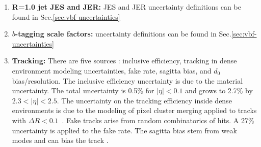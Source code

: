 \begin{enumerate}
\item \textbf{R=1.0 jet JES and JER:} JES and JER uncertainty definitions can be found in Sec.\ref{sec:vbf-uncertainties}
    

  \item \textbf{$b$-tagging scale factors:} \btagging uncertainty definitions can be found in Sec.\ref{sec:vbf-uncertainties}
  
  
  \item \textbf{Tracking:} There are five sources : inclusive efficiency, tracking in dense environment modeling uncertainties, fake rate, sagitta bias, and $d_0$ bias/resolution. The inclusive efficiency uncertainty is due to the material uncertainty.  The total uncertainty is 0.5\% for $|\eta| < 0.1$ and grows to 2.7\% by $2.3 < |\eta| < 2.5$.  The uncertainty on the tracking efficiency inside dense environments is due to the modeling of pixel cluster merging applied to tracks with $\Delta R < 0.1$~\cite{Aaboud:2017all,ATL-PHYS-PUB-2016-007,ATL-PHYS-PUB-2017-016}. Fake tracks arise from random combinatorics of hits. A 27\% uncertainty is applied to the fake rate. The sagitta bias stem from weak modes and can bias the track \pt. %
  

\end{enumerate}
